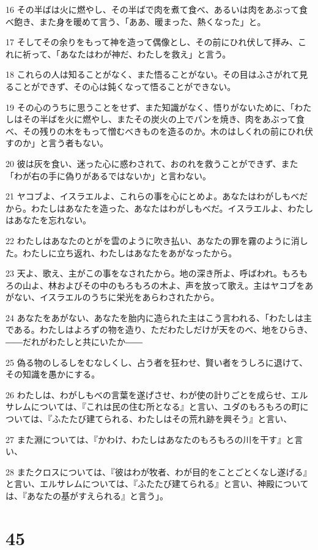 \par 16 その半ばは火に燃やし、その半ばで肉を煮て食べ、あるいは肉をあぶって食べ飽き、また身を暖めて言う、「ああ、暖まった、熱くなった」と。
\par 17 そしてその余りをもって神を造って偶像とし、その前にひれ伏して拝み、これに祈って、「あなたはわが神だ、わたしを救え」と言う。
\par 18 これらの人は知ることがなく、また悟ることがない。その目はふさがれて見ることができず、その心は鈍くなって悟ることができない。
\par 19 その心のうちに思うことをせず、また知識がなく、悟りがないために、「わたしはその半ばを火に燃やし、またその炭火の上でパンを焼き、肉をあぶって食べ、その残りの木をもって憎むべきものを造るのか。木のはしくれの前にひれ伏すのか」と言う者もない。
\par 20 彼は灰を食い、迷った心に惑わされて、おのれを救うことができず、また「わが右の手に偽りがあるではないか」と言わない。
\par 21 ヤコブよ、イスラエルよ、これらの事を心にとめよ。あなたはわがしもべだから。わたしはあなたを造った、あなたはわがしもべだ。イスラエルよ、わたしはあなたを忘れない。
\par 22 わたしはあなたのとがを雲のように吹き払い、あなたの罪を霧のように消した。わたしに立ち返れ、わたしはあなたをあがなったから。
\par 23 天よ、歌え、主がこの事をなされたから。地の深き所よ、呼ばわれ。もろもろの山よ、林およびその中のもろもろの木よ、声を放って歌え。主はヤコブをあがない、イスラエルのうちに栄光をあらわされたから。
\par 24 あなたをあがない、あなたを胎内に造られた主はこう言われる、「わたしは主である。わたしはよろずの物を造り、ただわたしだけが天をのべ、地をひらき、――だれがわたしと共にいたか――
\par 25 偽る物のしるしをむなしくし、占う者を狂わせ、賢い者をうしろに退けて、その知識を愚かにする。
\par 26 わたしは、わがしもべの言葉を遂げさせ、わが使の計りごとを成らせ、エルサレムについては、『これは民の住む所となる』と言い、ユダのもろもろの町については、『ふたたび建てられる、わたしはその荒れ跡を興そう』と言い、
\par 27 また淵については、『かわけ、わたしはあなたのもろもろの川を干す』と言い、
\par 28 またクロスについては、『彼はわが牧者、わが目的をことごとくなし遂げる』と言い、エルサレムについては、『ふたたび建てられる』と言い、神殿については、『あなたの基がすえられる』と言う」。

\chapter{45}

